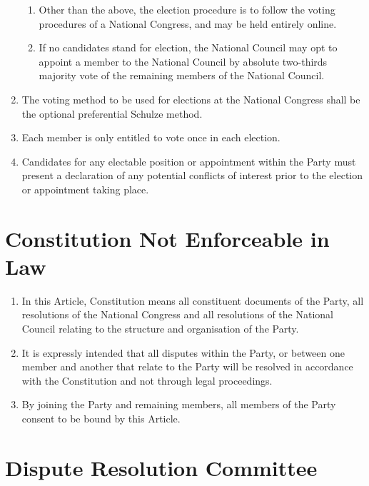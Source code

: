 \documentclass[a4paper,titlepage,8.5pt]{article}
\begin{document}
\begin{enumerate}
\begin{enumerate}
    \item Other than the above, the election procedure is to follow the voting procedures of a National Congress, and may be held entirely online.
    \item If no candidates stand for election, the National Council may opt to appoint a member to the National Council by absolute two-thirds majority vote of the remaining members of the National Council.
\end{enumerate}
\item The voting method to be used for elections at the National Congress shall be the optional preferential Schulze method.
\item Each member is only entitled to vote once in each election.
\item Candidates for any electable position or appointment within the Party must present a declaration of any potential conflicts of interest prior to the election or appointment taking place.
\end{enumerate}

\section{Constitution Not Enforceable in Law}

\begin{enumerate}
\item In this Article, Constitution means all constituent documents of the Party, all resolutions of the National Congress and all resolutions of the National Council relating to the structure and organisation of the Party.
\item It is expressly intended that all disputes within the Party, or between one member and another that relate to the Party will be resolved in accordance with the Constitution and not through legal proceedings.
\item By joining the Party and remaining members, all members of the Party consent to be bound by this Article.
\end{enumerate}

\section{Dispute Resolution Committee}
\end{document}
